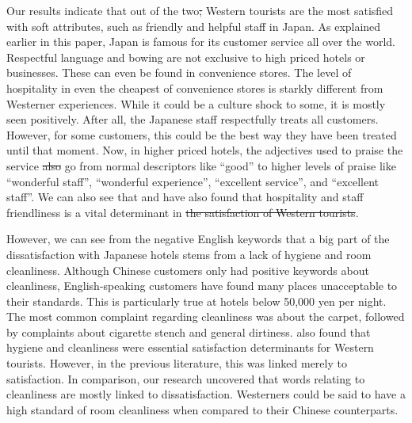 \documentclass[smallextended,natbib]{svjour3}       %
\providecommand{\DIFadd}[1]{{\protect\color{blue}\uwave{#1}}} %
\providecommand{\DIFdel}[1]{{\protect\color{red}\sout{#1}}}                      %
\providecommand{\DIFaddbegin}{} %
\providecommand{\DIFaddend}{} %
\providecommand{\DIFdelbegin}{} %
\providecommand{\DIFdelend}{} %
\newcommand{\DIFscaledelfig}{0.5}
\newlength{\DIFdelgraphicswidth} %
\newlength{\DIFdelgraphicsheight} %
\newcommand{\DIFaddincludegraphics}[2][]{{\color{blue}\fbox{\DIFOincludegraphics[#1]{#2}}}} %
\newcommand{\DIFdelincludegraphics}[2][]{%
\sbox{\DIFdelgraphicsbox}{\DIFOincludegraphics[#1]{#2}}%
\settoboxwidth{\DIFdelgraphicswidth}{\DIFdelgraphicsbox} %
\settoboxtotalheight{\DIFdelgraphicsheight}{\DIFdelgraphicsbox} %
\scalebox{\DIFscaledelfig}{%
\parbox[b]{\DIFdelgraphicswidth}{\usebox{\DIFdelgraphicsbox}\\[-\baselineskip] \rule{\DIFdelgraphicswidth}{0em}}\llap{\resizebox{\DIFdelgraphicswidth}{\DIFdelgraphicsheight}{%
\setlength{\unitlength}{\DIFdelgraphicswidth}%
\begin{picture}(1,1)%
\thicklines\linethickness{2pt} %
{\color[rgb]{1,0,0}\put(0,0){\framebox(1,1){}}}%
{\color[rgb]{1,0,0}\put(0,0){\line( 1,1){1}}}%
{\color[rgb]{1,0,0}\put(0,1){\line(1,-1){1}}}%
\end{picture}%
}\hspace*{3pt}}} %
} %
\DeclareRobustCommand{\DIFaddbegin}{\DIFOaddbegin \let\includegraphics\DIFaddincludegraphics} %
\DeclareRobustCommand{\DIFaddend}{\DIFOaddend \let\includegraphics\DIFOincludegraphics} %
\DeclareRobustCommand{\DIFdelbegin}{\DIFOdelbegin \let\includegraphics\DIFdelincludegraphics} %
\DeclareRobustCommand{\DIFdelend}{\DIFOaddend \let\includegraphics\DIFOincludegraphics} %
\begin{document}
    Our results indicate that out of the two\DIFdelbegin \DIFdel{; }\DIFdelend \DIFaddbegin \DIFadd{, }\DIFaddend Western tourists are the most satisfied with soft attributes, such as friendly and helpful staff in Japan. As explained earlier in this paper, Japan is famous for its customer service all over the world. Respectful language and bowing are not exclusive to high priced hotels or businesses. These can even be found in convenience stores. The level of hospitality in even the cheapest of convenience stores is starkly different from Westerner experiences. While it could be a culture shock to some, it is mostly seen positively. After all, the Japanese staff respectfully treats all customers. However, for some customers, this could be the best way they have been treated until that moment. Now, in higher priced hotels, the adjectives used to praise the service \DIFdelbegin \DIFdel{also }\DIFdelend go from normal descriptors like ``good'' to higher levels of praise like ``wonderful staff'', ``wonderful experience'', ``excellent service'', and ``excellent staff''. We can also see that \cite{kozak2002} and \cite{shanka2004} have also found that hospitality and staff friendliness is a vital determinant in \DIFdelbegin \DIFdel{the satisfaction of Western tourists}\DIFdelend \DIFaddbegin \DIFadd{Western tourists' satisfaction}\DIFaddend .

    However, we can see from the negative English keywords that a big part of the dissatisfaction with Japanese hotels stems from a lack of hygiene and room cleanliness. Although Chinese customers only had positive keywords about cleanliness, English-speaking customers have found many places unacceptable to their standards. This is particularly true at hotels below 50,000 yen per night. The most common complaint regarding cleanliness was about the carpet, followed by complaints about cigarette stench and general dirtiness. \cite{kozak2002} also found that hygiene and cleanliness were essential satisfaction determinants for Western tourists. However, in the previous literature, this was linked merely to satisfaction. In comparison, our research uncovered that words relating to cleanliness are mostly linked to dissatisfaction. Westerners could be said to have a high standard of room cleanliness when compared to their Chinese counterparts.
\end{document}
